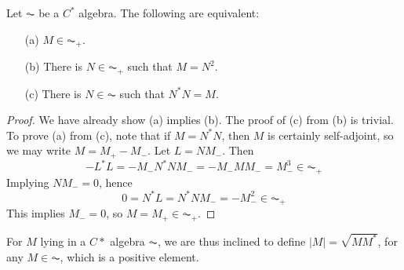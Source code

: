 \begin{prop}
    Let $\AC$ be a $C^*$ algebra. The following are equivalent:
    \begin{enumerate}
        \item[(a)] $M \in \AC_+$.
        \item[(b)] There is $N \in \AC_+$ such that $M = N^2$.
        \item[(c)] There is $N \in \AC$ such that $N^*N = M$.
    \end{enumerate}
\end{prop}
\begin{proof}
    We have already show (a) implies (b). The proof of (c) from (b) is trivial. To prove (a) from (c), note that if $M = N^*N$, then $M$ is certainly self-adjoint, so we may write $M = M_+ - M_-$. Let $L = NM_-$. Then
    \[ - L^*L = - M_-N^*NM_- = - M_- M M_- = M_-^3 \in \AC_+ \]
    Implying $NM_- = 0$, hence
    \[ 0 = N^*L = N^*NM_- = -M_-^2 \in \AC_+ \]
    This implies $M_- = 0$, so $M = M_+ \in \AC_+$.
\end{proof}

For $M$ lying in a $C*$ algebra $\AC$, we are thus inclined to define $|M| = \sqrt{MM^*}$, for any $M \in \AC$, which is a positive element.

